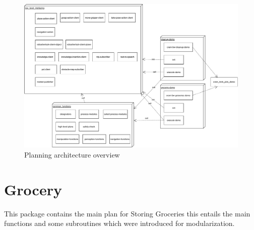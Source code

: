\documentclass[main.tex]{subfiles}
\begin{document}
        \begin{figure}[H]
            \centering
            \includegraphics[width=\textwidth]{pictures/diagramms/planning.pdf}
            \caption{Planning architecture overview}
            \label{planning-overview}
        \end{figure}
        
        \section{Grocery}
        \label{grocery}
        This package contains the main plan for Storing Groceries this entails the main functions and some subroutines which were introduced for modularization. 
\end{document}

